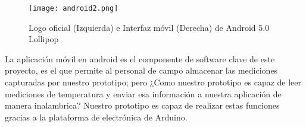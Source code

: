 \begin{figure}[H]
	\centering
	\texttt{[image: android2.png]}
	\caption{Logo oficial (Izquierda) e Interfaz móvil (Derecha) de Android 5.0 Lollipop}
\end{figure}

\par \noindent
La aplicación móvil en android es el componente de software clave de este proyecto, es el que permite al personal de campo almacenar las mediciones capturadas por nuestro prototipo; pero ¿Como nuestro prototipo es capaz de leer mediciones de temperatura y enviar esa información a nuestra aplicación de manera inalambrica? Nuestro prototipo es capaz de realizar estas funciones gracias a la plataforma de electrónica de Arduino. 








